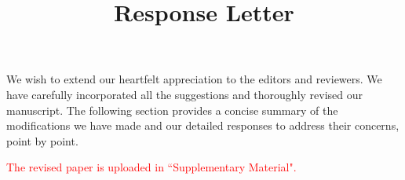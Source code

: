 \documentclass[default]{sn-jnl}%
\theoremstyle{thmstyleone}%
\theoremstyle{thmstyletwo}%
\theoremstyle{thmstylethree}%
\begin{document}
\title[]{Response Letter}



\maketitle



We wish to extend our heartfelt appreciation to the editors and reviewers.
We have carefully incorporated all the suggestions and thoroughly revised our manuscript. The following section provides a concise summary of the modifications we have made and our detailed responses to address their concerns, point by point. 

\noindent\textcolor{red}{The revised paper is uploaded in ``Supplementary Material".}

    
    
    
    
\end{document}
